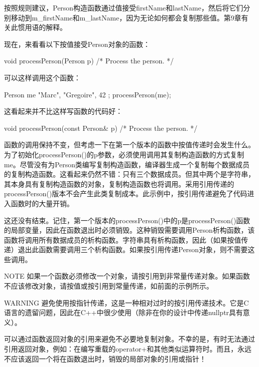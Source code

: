 按照规则建议，Person构造函数通过值接受firstName和lastName，然后将它们分别移动到m\_firstName和m\_lastName，因为无论如何都会复制那些值。第9章有关此惯用语的解释。

现在，来看看以下按值接受Person对象的函数：

\begin{cpp}
void processPerson(Person p) { /* Process the person. */ }
\end{cpp}

可以这样调用这个函数：

\begin{cpp}
Person me { "Marc", "Gregoire", 42 };
processPerson(me);
\end{cpp}

这看起来并不比这样写函数的代码好：

\begin{cpp}
void processPerson(const Person& p) { /* Process the person. */ }
\end{cpp}

函数的调用保持不变，但考虑一下在第一个版本的函数中按值传递时会发生什么。为了初始化processPerson()的p参数，必须使用调用其复制构造函数的方式复制me。尽管没有为Person类编写复制构造函数，编译器生成一个复制每个数据成员的复制构造函数。这看起来仍然不错：只有三个数据成员。但其中两个是字符串，其本身具有复制构造函数的对象，复制构造函数也将调用。采用引用传递的processPerson()版本不会产生此类复制成本。此示例中，按引用传递避免了代码进入函数时的大量开销。

这还没有结束。记住，第一个版本的processPerson()中的p是processPerson()函数的局部变量，因此在函数退出时必须销毁。这种销毁需要调用Person析构函数，该函数将调用所有数据成员的析构函数。字符串具有析构函数，因此（如果按值传递）退出此函数需要调用三个析构函数。如果按引用传递Person对象，则不需要这些调用。

\begin{myNotic}{NOTE}
如果一个函数必须修改一个对象，请按引用到非常量传递对象。如果函数不应该修改对象，请按值或按引用到常量传递，如前面的示例所示。
\end{myNotic}

\begin{myWarning}{WARNING}
避免使用按指针传递，这是一种相对过时的按引用传递技术。它是C语言的遗留问题，因此在C++中很少使用（除非在你的设计中传递nullptr具有意义）。
\end{myWarning}


可以通过函数返回对象的引用来避免不必要地复制对象。不幸的是，有时无法通过引用返回对象，例如：在编写重载的operator+和其他类似运算符时。而且，永远不应该返回一个将在函数退出时，销毁的局部对象的引用或指针！

